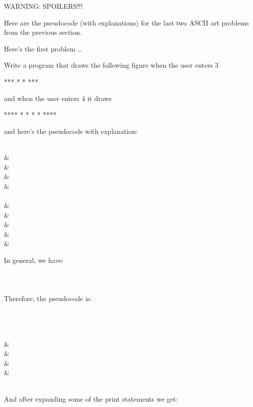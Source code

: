 \begin{console}
WARNING: SPOILERS!!!

Here are the pseudocode (with explanations) for the last two ASCII art
problems from the previous section.

Here's the first problem \ldots

\begin{ex}
Write a program that draws the following figure when
the user enters 3
\begin{console}
***
* *
***
\end{console}
and when the user enters 4 it draws
\begin{console}
****
*  *
*  *
****
\end{console}
and here's the pseudocode with explanation:
\begin{flalign*}
\\
&    \\
&    \\
&    \\
&    \\    
\\      
&\\
&    \\
&    \\
&    \\
&    \\
\end{flalign*}
In general, we have:\\
\\
\\
\\
Therefore, the pseudocode is:
\begin{flalign*}
\\
\\
\\
& \\
& \\
& \\
& \\
\\
\end{flalign*}
And after expanding some of the print statements we get:

\end{ex}
\end{console}
